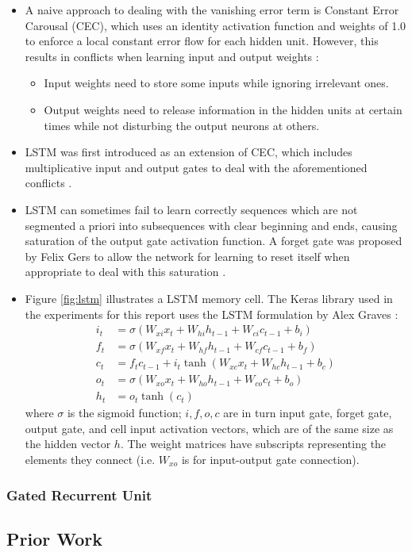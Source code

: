     \begin{itemize}
        \item A naive approach to dealing with the vanishing error term is Constant Error Carousal (CEC), which uses an identity activation function and weights of 1.0 to enforce a local constant error flow for each hidden unit. However, this results in conflicts when learning input and output weights \cite{Hochreiter:1997:LSM:1246443.1246450}:
        \begin{itemize}
            \item Input weights need to store some inputs while ignoring irrelevant ones.
            \item Output weights need to release information in the hidden units at certain times while not disturbing the output neurons at others.
        \end{itemize}
        \item LSTM was first introduced as an extension of CEC, which includes multiplicative input and output gates to deal with the aforementioned conflicts \cite{Hochreiter:1997:LSM:1246443.1246450}.
        \item LSTM can sometimes fail to learn correctly sequences which are not segmented a priori into subsequences with clear beginning and ends, causing saturation of the output gate activation function. A forget gate was proposed by Felix Gers to allow the network for learning to reset itself when appropriate to deal with this saturation \cite{Gers:2000:LFC:1121912.1121915}.
        \item Figure \ref{fig:lstm} illustrates a LSTM memory cell. The Keras library used in the experiments for this report uses the LSTM formulation by Alex Graves \cite{Graves2012-385, DBLP:journals/corr/Graves13}:
        \begin{align*}
            i_t & = \sigma(W_{xi}x_t + W_{hi}h_{t-1} + W_{ci}c_{t-1} + b_i) \\
            f_t & = \sigma(W_{xf}x_t + W_{hf}h_{t-1} + W_{cf}c_{t-1} + b_f) \\
            c_t & =  f_t c_{t-1} + i_t\tanh(W_{xc}x_t + W_{hc}h_{t-1} + b_c) \\
            o_t & = \sigma(W_{xo}x_t + W_{ho}h_{t-1} + W_{co}c_{t} + b_o) \\
            h_t & = o_t \tanh(c_t)
        \end{align*}
        where $\sigma$ is the sigmoid function; $i, f, o, c$ are in turn input gate, forget gate, output gate, and cell input activation vectors, which are of the same size as the hidden vector $h$. The weight matrices have subscripts representing the elements they connect (i.e. $W_{xo}$ is for input-output gate connection).
    \end{itemize}

    \subsubsection*{Gated Recurrent Unit}


\subsection{Prior Work}
